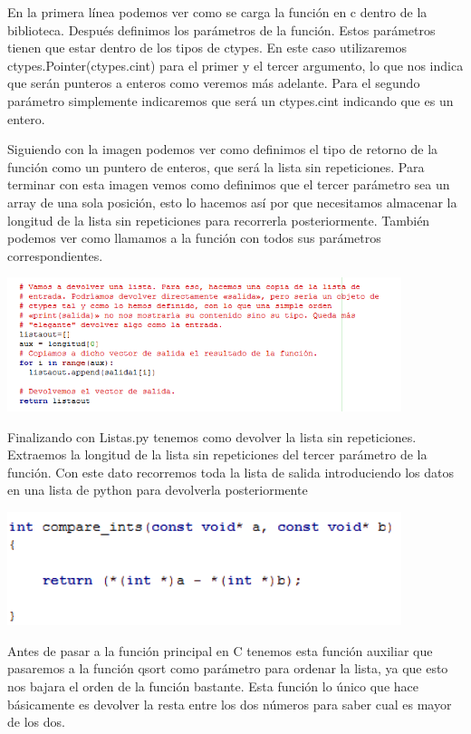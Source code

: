 \documentclass{article}
\begin{document}
En la primera línea podemos ver como se carga la función en c dentro de la biblioteca. Después definimos los parámetros de la función. Estos parámetros tienen que estar dentro de los tipos de ctypes. En este caso utilizaremos ctypes.Pointer(ctypes.cint) para el primer y el tercer argumento, lo que nos indica que serán punteros a enteros como veremos más adelante. Para el segundo parámetro simplemente indicaremos que será un ctypes.cint indicando que es un entero.

Siguiendo con la imagen podemos ver como definimos el tipo de retorno de la función como un puntero de enteros, que será la lista sin repeticiones. Para terminar con esta imagen vemos como definimos que el tercer parámetro sea un array de una sola posición, esto lo hacemos así por que necesitamos almacenar la longitud de la lista sin repeticiones para recorrerla posteriormente. También podemos ver como llamamos a la función con todos sus parámetros correspondientes.

\includegraphics[width=11.5cm]{ctypes2.PNG}

Finalizando con Listas.py tenemos como devolver la lista sin repeticiones. Extraemos la longitud de la lista sin repeticiones del tercer parámetro de la función. Con este dato recorremos toda la lista de salida introduciendo los datos en una lista de python para devolverla posteriormente

\includegraphics[width=11.5cm]{Comparacion.PNG}

Antes de pasar a la función principal en C tenemos esta función auxiliar que pasaremos a la función qsort como parámetro para ordenar la lista, ya que esto nos bajara el orden de la función bastante. Esta función lo único que hace básicamente es devolver la resta entre los dos números para saber cual es mayor de los dos.
\end{document}
